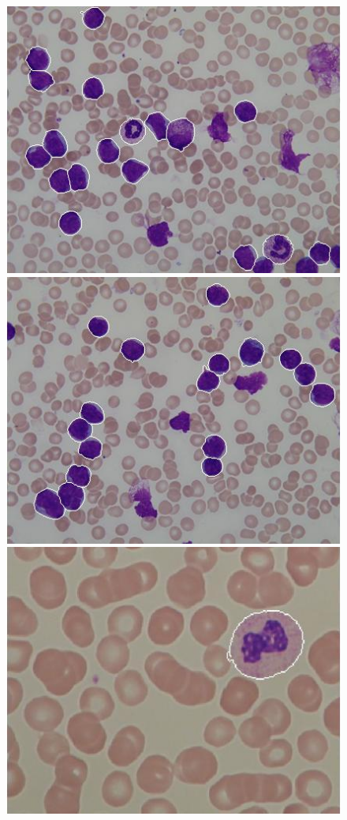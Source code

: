 \documentclass[final,a4paper,12pt,english]{UnicaPhdThesis3}
\begin{document}
{\begin{figure}[!htbp]
\centering
\hspace{-1.5mm}\includegraphics[height=0.23\textheight]{images/Fig16-006}\vspace{1mm}
\includegraphics[height=0.23\textheight]{images/Fig16-015}
\includegraphics[height=0.23\textheight]{images/Fig16-01}

\end{figure}}
\end{document}
